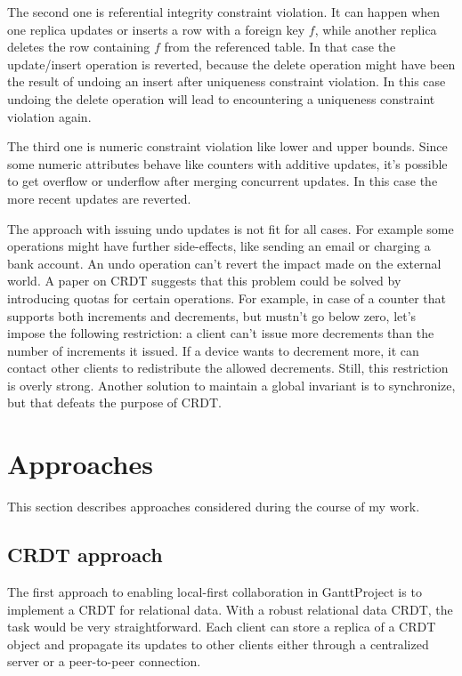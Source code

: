 \documentclass[a4paper, 11pt, oneside]{article}
\theoremstyle{definition}
\begin{document}
The second one is referential integrity constraint violation. It can happen when one replica updates or inserts a row with a foreign key $f$, while another replica deletes the row containing $f$ from the referenced table. In that case the update/insert operation is reverted, because the delete operation might have been the result of undoing an insert after uniqueness constraint violation. In this case undoing the delete operation will lead to encountering a uniqueness constraint violation again.

The third one is numeric constraint violation like lower and upper bounds. Since some numeric attributes behave like counters with additive updates, it's possible to get overflow or underflow after merging concurrent updates. In this case the more recent updates are reverted.

The approach with issuing undo updates is not fit for all cases. For example some operations might have further side-effects, like sending an email or charging a bank account.  An undo operation can't revert the impact made on the external world. A paper on CRDT \cite{crdt} suggests that this problem could be solved by introducing quotas for certain operations. For example, in case of a counter that supports both increments and decrements, but mustn't go below zero, let's impose the following restriction: a client can't issue more decrements than the number of increments it issued. If a device wants to decrement more, it can contact other clients to redistribute the allowed decrements. Still, this restriction is overly strong. Another solution to maintain a global invariant is to synchronize, but that defeats the purpose of CRDT.

\section{Approaches}
This section describes approaches considered during the course of my work.

\subsection{CRDT approach}
The first approach to enabling local-first collaboration in GanttProject is to implement a CRDT for relational data. With a robust relational data CRDT, the task would be very straightforward. Each client can store a replica of a CRDT object and propagate its updates to other clients either through a centralized server or a peer-to-peer connection.
\end{document}
